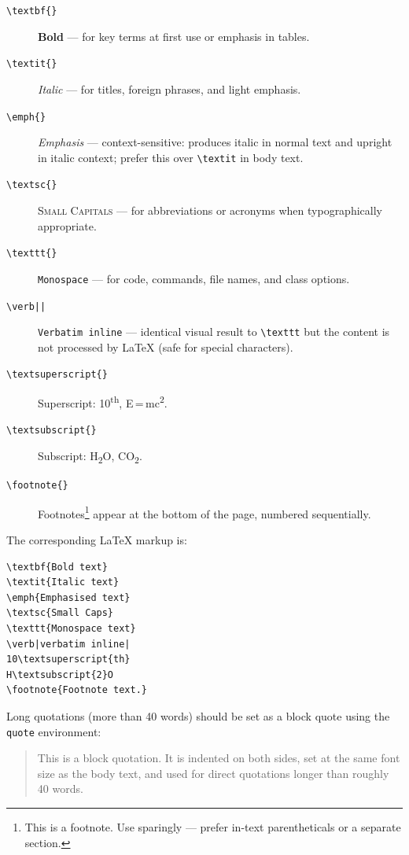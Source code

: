 \documentclass{wpom-upv}
\begin{document}
\begin{description}
  \item[\texttt{\textbackslash textbf\{\}}]
        \textbf{Bold} — for key terms at first use or emphasis in tables.
  \item[\texttt{\textbackslash textit\{\}}]
        \textit{Italic} — for titles, foreign phrases, and light emphasis.
  \item[\texttt{\textbackslash emph\{\}}]
        \emph{Emphasis} — context-sensitive: produces italic in normal text
        and upright in italic context; prefer this over \verb|\textit| in body text.
  \item[\texttt{\textbackslash textsc\{\}}]
        \textsc{Small Capitals} — for abbreviations or acronyms when typographically appropriate.
  \item[\texttt{\textbackslash texttt\{\}}]
        \texttt{Monospace} — for code, commands, file names, and class options.
  \item[\texttt{\textbackslash verb||}]
        \verb|Verbatim inline| — identical visual result to \verb|\texttt|
        but the content is not processed by \LaTeX{} (safe for special characters).
  \item[\texttt{\textbackslash textsuperscript\{\}}]
        Superscript: 10\textsuperscript{th}, E\,=\,mc\textsuperscript{2}.
  \item[\texttt{\textbackslash textsubscript\{\}}]
        Subscript: H\textsubscript{2}O, CO\textsubscript{2}.
  \item[\texttt{\textbackslash footnote\{\}}]
        Footnotes\footnote{This is a footnote. Use sparingly — prefer in-text
        parentheticals or a separate section.} appear at the bottom of
        the page, numbered sequentially.
\end{description}

The corresponding \LaTeX{} markup is:

\begin{verbatim}
\textbf{Bold text}
\textit{Italic text}
\emph{Emphasised text}
\textsc{Small Caps}
\texttt{Monospace text}
\verb|verbatim inline|
10\textsuperscript{th}
H\textsubscript{2}O
\footnote{Footnote text.}
\end{verbatim}

Long quotations (more than 40 words) should be set as a block quote
using the \texttt{quote} environment:

\begin{quote}
  This is a block quotation. It is indented on both sides, set at the
  same font size as the body text, and used for direct quotations
  longer than roughly 40 words.
\end{quote}
\end{document}
